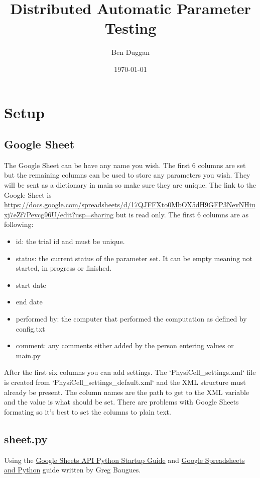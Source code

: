 \documentclass[12pt]{article}
\begin{document}
\title{\vspace{-3cm}Distributed Automatic Parameter Testing}
\author{Ben Duggan}
\date{\today}
\maketitle

\section{Setup}
\subsection{Google Sheet}
The Google Sheet can be have any name you wish.  The first 6 columns are set but the remaining columns can be used to store any parameters you wish.  They will be sent as a dictionary in main so make sure they are unique.  The link to the Google Sheet is \url{https://docs.google.com/spreadsheets/d/17QJFFXto0MbOX5dH9GFP3NevNHiuxj7eZf7Pevcg96U/edit?usp=sharing} but is read only.  The first 6 columns are as following:
\begin{itemize}
	\item id: the trial id and must be unique.
	\item status: the current status of the parameter set.  It can be empty meaning not started, in progress or finished.
	\item start date
	\item end date
	\item performed by: the computer that performed the computation as defined by config.txt
	\item comment: any comments either added by the person entering values or main.py
\end{itemize}
After the first six columns you can add settings.  The `PhysiCell\_settings.xml` file is created from `PhysiCell\_settings\_default.xml` and the XML structure must already be present.  The column names are the path to get to the XML variable and the value is what should be set.  There are problems with Google Sheets formating so it's best to set the columns to plain text.

\subsection{sheet.py}
Using the \href{https://developers.google.com/sheets/api/quickstart/python}{Google Sheets API Python Startup Guide} and  \href{https://www.twilio.com/blog/2017/02/an-easy-way-to-read-and-write-to-a-google-spreadsheet-in-python.html?utm_source=youtube&utm_medium=video&utm_campaign=youtube_python_google_sheets}{Google Spreadsheets and Python} guide written by Greg Baugues.\\
\end{document}
